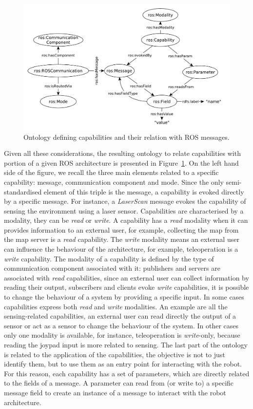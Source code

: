 \begin{figure}[t]
\centering
\includegraphics[width=\textwidth]{gfx/onto/comptocapa1}
\caption{Ontology defining capabilities and their relation with ROS messages.}
\label{fig:onto-capa}
\end{figure}

Given all these considerations, the resulting ontology to relate capabilities with portion of a given ROS architecture is presented in Figure~\ref{fig:onto-capa}. On the left hand side of the figure, we recall the three main elements related to a specific capability: message, communication component and mode. Since the only semi-standardised element of this triple is the message, a capability is evoked directly by a specific message. For instance, a \textit{LaserScan} message evokes the capability of sensing the environment using a laser sensor. Capabilities are characterised by a modality, they can be \textit{read} or \textit{write}. A capability has a \textit{read} modality when it can provides information to an external user, for example, collecting the map from the map server is a \textit{read} capability. The \textit{write} modality means an external user can influence the behaviour of the architecture, for example, teleoperation is a \textit{write} capability. The modality of a capability is defined by the type of communication component associated with it: publishers and servers are associated with \textit{read} capabilities, since an external user can collect information by reading their output, subscribers and clients evoke \textit{write} capabilities, it is possible to change the behaviour of a system by providing a specific input. In some cases capabilities express both \textit{read} and \textit{write} modalities. An example are all the sensing-related capabilities, an external user can read directly the output of a sensor or act as a sensor to change the behaviour of the system. In other cases only one modality is available, for instance, teleoperation is \textit{write}-only, because reading the joypad input is more related to sensing. The last part of the ontology is related to the application of the capabilities, the objective is not to just identify them, but to use them as an entry point for interacting with the robot. For this reason, each capability has a set of parameters, which are directly related to the fields of a message. A parameter can read from (or write to) a specific message field to create an instance of a message to interact with the robot architecture.

